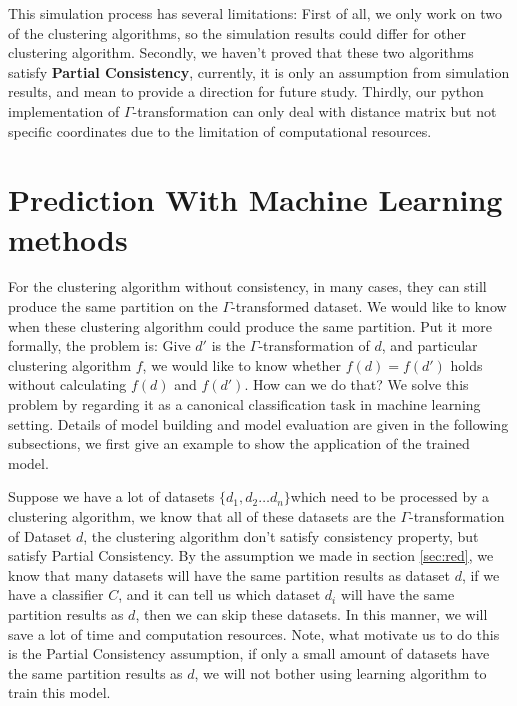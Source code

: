 \documentclass{uonmathreport}
\begin{document}
This simulation process has several limitations: First of all, we only work on two of the clustering algorithms, so the simulation results could differ for other clustering algorithm. Secondly, we haven't proved that these two algorithms satisfy \textbf{Partial Consistency}, currently, it is only an assumption from simulation results, and mean to provide a direction for future study. Thirdly, our python implementation of $\Gamma$-transformation can only deal with distance matrix but not specific coordinates due to the limitation of computational resources.

\section{Prediction With Machine Learning methods} \label{sec:Classification}


For the clustering algorithm without consistency, in many cases, they can still produce the same partition on the $\Gamma$-transformed dataset. We would like to know when these clustering algorithm could produce the same partition. Put it more formally, the problem is: Give $d'$ is the $\Gamma$-transformation of $d$, and particular clustering algorithm $f$, we would like to know whether $f(d)=f(d')$ holds without calculating $f(d)$ and $f(d')$. How can we do that? We solve this problem by regarding it as a canonical classification task in machine learning setting. Details of model building and model evaluation are given in the following subsections, we first give an example to show the application of the trained model.

Suppose we have a lot of datasets $\{d_1,d_2\ldots d_n\}$which need to be processed by a clustering algorithm, we know that all of these datasets are the $\Gamma$-transformation of Dataset $d$, the clustering algorithm don't satisfy consistency property, but satisfy Partial Consistency. By the assumption we made in section \ref{sec:red}, we know that many datasets will have the same  partition results as dataset $d$, if we have a classifier $C$, and it can tell us which dataset $d_i$ will have the same partition results as $d$, then we can skip these datasets. In this manner, we will save a lot of time and computation resources. Note, what motivate us to do this is the Partial Consistency assumption, if only a small amount of datasets have the same partition results as $d$, we will not bother using learning algorithm to train this model.
\end{document}
